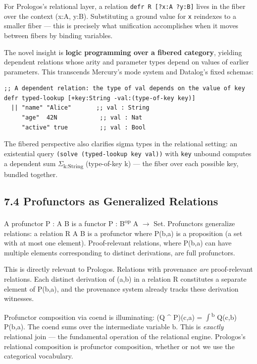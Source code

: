 \documentclass[11pt]{article}
\begin{document}
For Prologos's relational layer, a relation \texttt{defr R [?x:A ?y:B]} lives in the fiber over the context (x:A, y:B). Substituting a ground value for \texttt{x} reindexes to a smaller fiber --- this is precisely what unification accomplishes when it moves between fibers by binding variables.

The novel insight is \textbf{logic programming over a fibered category}, yielding dependent relations whose arity and parameter types depend on values of earlier parameters. This transcends Mercury's mode system and Datalog's fixed schemas:

\begin{verbatim}
;; A dependent relation: the type of val depends on the value of key
defr typed-lookup [+key:String -val:(type-of-key key)]
  || "name" "Alice"       ;; val : String
     "age"  42N            ;; val : Nat
     "active" true         ;; val : Bool
\end{verbatim}

The fibered perspective also clarifies sigma types in the relational setting: an existential query \texttt{(solve (typed-lookup key val))} with \texttt{key} unbound computes a dependent sum \(\Sigma\)\textsubscript{k:String} (type-of-key k) --- the fiber over each possible key, bundled together.
\subsection{7.4 Profunctors as Generalized Relations}
\label{sec:org52455c0}

A profunctor P : A \nrightarrow B is a functor P : B\textsuperscript{op} \texttimes{} A \(\to\) Set. Profunctors generalize relations: a relation R \subseteq A \texttimes{} B is a profunctor where P(b,a) is a proposition (a set with at most one element). Proof-relevant relations, where P(b,a) can have multiple elements corresponding to distinct derivations, are full profunctors.

This is directly relevant to Prologos. Relations with provenance \emph{are} proof-relevant relations. Each distinct derivation of (a,b) in a relation R constitutes a separate element of P(b,a), and the provenance system already tracks these derivation witnesses.

Profunctor composition via coend is illuminating: (Q \^{} P)(c,a) = \(\int\)\textsuperscript{b} Q(c,b) \texttimes{} P(b,a). The coend sums over the intermediate variable b. This is \emph{exactly} relational join --- the fundamental operation of the relational engine. Prologos's relational composition is profunctor composition, whether or not we use the categorical vocabulary.
\end{document}
